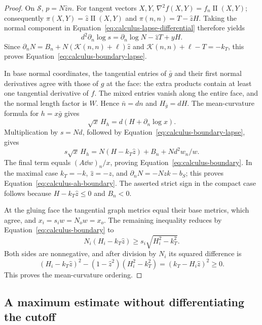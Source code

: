 \begin{proof}
On $\mathcal S$, $p=N\hat z n$.  For tangent vectors $X,Y$,
$\nabla^2f(X,Y)=f_n\operatorname{II}(X,Y)$; consequently
$\pi(X,Y)=\hat z\operatorname{II}(X,Y)$ and
$\pi(n,n)=T-\hat z H$.  Taking the normal component in
Equation~\eqref{eq:calculus-lapse-differential} therefore yields
\[
 d^2\partial_n\log s
 =\partial_n\log N-\hat z T+yH.
\]
Since $\partial_nN=B_n+N(\mathcal K(n,n)+\ell)\hat z$ and
$\mathcal K(n,n)+\ell-T=-k_T$, this proves
Equation~\eqref{eq:calculus-boundary-lapse}.

In base normal coordinates, the tangential entries of $\bar g$ and
their first normal derivatives agree with those of $g$ at the face:
the extra products contain at least one tangential derivative of $f$.
The mixed entries vanish along the entire face, and the normal length
factor is $W$.  Hence $\bar n=dn$ and $H_{\bar g}=dH$.  The
mean-curvature formula for $h=x\bar g$ gives
\[
 \sqrt{x}\,H_h=d(H+\partial_n\log x).
\]
Multiplication by $s=Nd$, followed by
Equation~\eqref{eq:calculus-boundary-lapse}, gives
\[
 s\sqrt{x}\,H_h
 =N(H-k_T\hat z)+B_n+Nd^2w_n/w.
\]
The final term equals $(A\dd w)_n/x$, proving
Equation~\eqref{eq:calculus-boundary}.  In the maximal case
$k_T=-k$, $\hat z=-z$, and $\partial_nN=-Nzk-b_S$;
this proves Equation~\eqref{eq:calculus-ah-boundary}.
The asserted strict sign in the compact case follows because
$H-k_T\hat z\le0$ and $B_n<0$.

At the gluing face the tangential graph metrics equal their base
metrics, which agree, and $x_i=s_iw=N_ow=x_o$.
The remaining inequality reduces by
Equation~\eqref{eq:calculus-boundary} to
\[
 N_i(H_i-k_T\hat z)\ge s_i\sqrt{H_i^2-k_T^2}.
\]
Both sides are nonnegative, and after division by $N_i$ its squared
difference is
\[
 (H_i-k_T\hat z)^2-(1-\hat z^2)(H_i^2-k_T^2)
       =(k_T-H_i\hat z)^2\ge0.
\]
This proves the mean-curvature ordering.
\end{proof}

\subsection{A maximum estimate without differentiating the cutoff}

